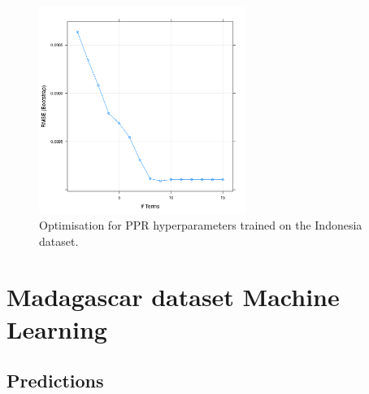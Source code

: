 \documentclass[review]{elsarticle}
\begin{document}
\begin{figure}[h!]
  \centering
  \includegraphics[width=0.6\textwidth]{figs/SI/ppropt_idn.png}
\caption{
  Optimisation for PPR hyperparameters trained on the Indonesia dataset.
}

\end{figure}






\clearpage
\section{Madagascar dataset Machine Learning}





\subsection{Predictions}
\end{document}
